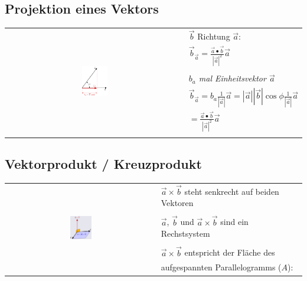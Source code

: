 \subsection{Projektion eines Vektors}

\begin{tabular}{cl}
    \multirow{7}{*}{
        \includegraphics[width=0.15\textwidth]{assets/projection-of-vector.png}
    }
    & $\vec{b}$ Richtung $\vec{a}$:\\
    & $\vec{b}_{\vec{a}} = \frac{\vec{a} \bullet \vec{b}}{|\vec{a}|^2} \vec{a}$\\
    & \\
    & \textit{$b_a$ mal Einheitsvektor $\vec{a}$} \\
    &
        $\vec{b}_{\vec{a}} = b_a \frac{1}{|\vec{a}|} \vec{a} =
        |\vec{a}||\vec{b}|\cos \phi \frac{1}{|\vec{a}|} \vec{a}$ \\
    & $= \frac{\vec{a} \bullet \vec{b}}{|\vec{a}|^2} \vec{a}$\\
    & \\
\end{tabular}

\subsection{Vektorprodukt / Kreuzprodukt}

\begin{tabular}{cl}
    \multirow{7}{*}{
        \includegraphics[width=0.15\textwidth]{assets/vectorproduct.png}
    }
    & $\vec{a} \times \vec{b}$ steht senkrecht auf beiden Vektoren \\
    & \\
    & $\vec{a}$, $\vec{b}$ und $\vec{a} \times \vec{b}$ sind ein Rechstsystem \\
    & \\
    & $\vec{a} \times \vec{b}$ entspricht der Fläche des \\
    & aufgespannten Parallelogramms ($A$): \\
\end{tabular} \\

